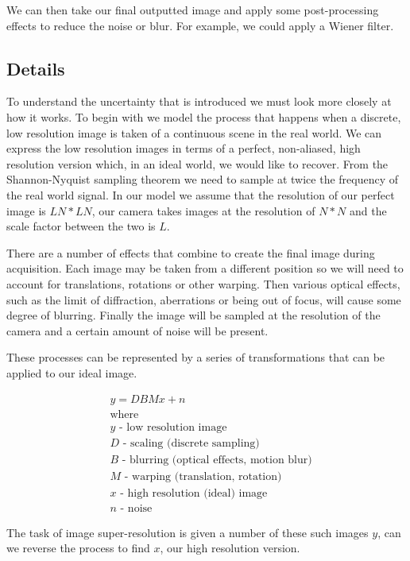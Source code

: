 We can then take our final outputted image and apply some post-processing effects to reduce the noise or blur. For example, we could apply a Wiener filter\cite{wienerfilter}.

\subsection*{Details}
To understand the uncertainty that is introduced we must look more closely at how it works.
To begin with we model the process that happens when a discrete, low resolution image is taken of a continuous scene in the real world. We can express the low resolution images in terms of a perfect, non-aliased, high resolution version which, in an ideal world, we would like to recover. From the Shannon-Nyquist sampling theorem we need to sample at twice the frequency of the real world signal\cite{shannonnyquist}. In our model we assume that the resolution of our perfect image is $LN * LN$, our camera takes images at the resolution of $N * N$ and the scale factor between the two is $L$.

There are a number of effects that combine to create the final image during acquisition. Each image may be taken from a different position so we will need to account for translations, rotations or other warping. Then various optical effects, such as the limit of diffraction, aberrations or being out of focus, will cause some degree of blurring. Finally the image will be sampled at the resolution of the camera and a certain amount of noise will be present.

These processes can be represented by a series of transformations that can be applied to our ideal image.

\begin{align*} 
& y = DBMx + n \nonumber \\ 
& \text{where} \\
& y \text{ - low resolution image} \nonumber \\
& D \text{ - scaling (discrete sampling)} \nonumber \\
& B \text{ - blurring (optical effects, motion blur)} \nonumber \\
& M \text{ - warping (translation, rotation)} \nonumber \\
& x \text{ - high resolution (ideal) image} \nonumber \\
& n \text{ - noise} \nonumber
\end{align*}

The task of image super-resolution is given a number of these such images $y$, can we reverse the process to find $x$, our high resolution version.

